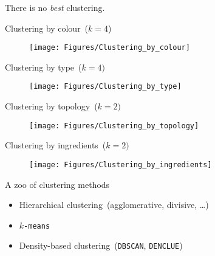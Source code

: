 \documentclass[aspectratio=169]{beamer}
\begin{document}
  \begin{frame}{}
    \begin{center}
      \begin{huge}
        There is no \emph{best} clustering.
      \end{huge}
    \end{center}
  \end{frame}

  \begin{frame}{Clustering by colour~($k = 4$)}
    \begin{figure}
      \texttt{[image: Figures/Clustering\_by\_colour]}
    \end{figure}
  \end{frame}

  \begin{frame}{Clustering by type~($k = 4)$}
    \begin{figure}
      \texttt{[image: Figures/Clustering\_by\_type]}
    \end{figure}
  \end{frame}

  \begin{frame}{Clustering by topology~($k = 2)$}
    \begin{figure}
      \texttt{[image: Figures/Clustering\_by\_topology]}
    \end{figure}
  \end{frame}

  \begin{frame}{Clustering by ingredients~($k = 2)$}
    \begin{figure}
      \texttt{[image: Figures/Clustering\_by\_ingredients]}
    \end{figure}
  \end{frame}

  \begin{frame}{A zoo of clustering methods}
    \begin{itemize}
      \item Hierarchical clustering~(agglomerative, divisive, \dots)
      \item \texttt{$k$-means}
      \item Density-based clustering~(\texttt{DBSCAN}, \texttt{DENCLUE})
    \end{itemize}
  \end{frame}
\end{document}
